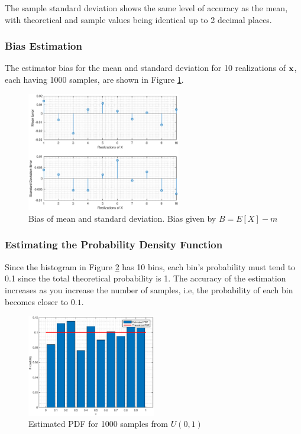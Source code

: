 The sample standard deviation shows the same level of accuracy as the mean, with theoretical and sample values being identical up to 2 decimal places.

\pagebreak

\subsubsection{Bias Estimation}

The estimator bias for the mean and standard deviation for 10 realizations of $\bf x$, each having 1000 samples, are shown in Figure \ref{fig:bias_norm}.

\begin{figure}[h!]
\centering
\includegraphics[width=0.6\textwidth]{bias_norm}
\caption{\label{fig:bias_norm} Bias of mean and standard deviation. Bias given by $B = E[X]-m$}
\end{figure}


\subsubsection{Estimating the Probability Density Function}
\label{sec:1.1.4}

Since the histogram in Figure \ref{fig:pdf_norm} has 10 bins, each bin's probability must tend to 0.1 since the total theoretical probability is 1. The accuracy of the estimation increases as you increase the number of samples, i.e, the probability of each bin becomes closer to $0.1$.

\begin{figure}[h!]
\centering
\includegraphics[width=0.5\textwidth]{pdf_norm}
\caption{\label{fig:pdf_norm} Estimated PDF for 1000 samples from $U(0,1)$}
\end{figure}


